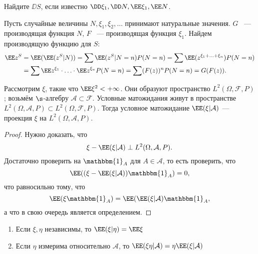  \begin{exercise}
     Найдите $\DD S$, если известно $\DD\xi_1, \DD N, \EE \xi_1, \EE N$.
 \end{exercise}

 \begin{example}
    Пусть случайные величины $N, \xi_1, \xi_2, \ldots$ принимают натуральные значения.
     $G$ ~--- производящая функция $N$, $F$ ~--- производящая функция $\xi_1$. Найдем производящую функцию для $S$:
     \begin{align*}
         \EE z^S &= \EE (\EE (z^S | N)) = \sum \EE (z^S | N = n)P(N = n) = \sum \EE (z^{\xi_1 + \ldots + \xi_n}) P(N = n) \\&=
         \sum \EE z^{\xi_1}\cdot\ldots\cdot \EE z^{\xi_n} P(N = n) = \sum (F(z))^n P(N= n) = G(F(z)).
     \end{align*}
    
 \end{example}

\begin{remark}
 Рассмотрим $\xi$, такие что $\EE \xi^2 < +\infty$. Они образуют пространство $L^2(\Omega, \mathcal{F}, P)$; возьмём $\s$-алгебру $\mathcal{A} \subset\mathcal{F}$. Условные матожидания живут в пространстве $L^2(\Omega, \mathcal{A}, P)\subset L^2(\Omega, \mathcal{F}, P)$. Тогда 
 условное матожидание $\EE (\xi |\mathcal{A} )$ --- проекция $\xi$ на $L^2(\Omega, \mathcal{A}, P)$.
\end{remark}


 \begin{proof} Нужно доказать, что
    $$\xi- \EE (\xi | \mathcal{A} ) \perp L^2(\Omega, \mathcal{A}, P).$$ 
    Достаточно проверить на $\mathbbm{1}_A$ для $A\in\mathcal{A}$, то есть проверить, что
     $$\EE ((\xi - \EE (\xi | \mathcal{A}))\mathbbm{1}_A) = 0,$$ что равносильно тому, что
     $$\EE (\xi \mathbbm{1}_A) = \EE (\EE (\xi | \mathcal{A})\mathbbm{1}_A,$$
     а что в свою очередь является определением.
 \end{proof}

 \begin{theorem}
 \enewline
     \begin{enumerate}
         \item Если $\xi, \eta$ независимы, то $\EE (\xi | \eta) = \EE \xi$
         \item Если $\eta$ измерима относительно $\mathcal{A}$, то $\EE (\xi\eta | \mathcal{A}) = \eta \EE (\xi | \mathcal{A})$
     \end{enumerate}
 \end{theorem}


